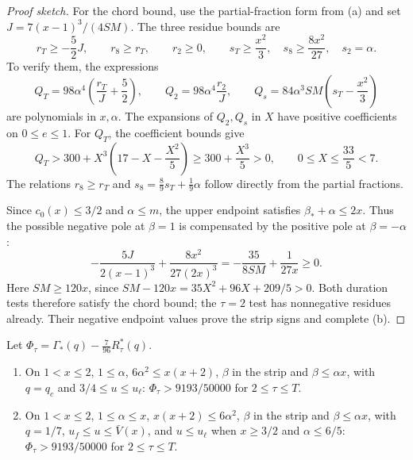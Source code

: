 \begin{proof}[Proof sketch]
For the chord bound, use the partial-fraction form from (a) and set
$J=7(x-1)^3/(4SM)$. The three residue bounds are
\[
 r_T\ge-\frac52J,\qquad r_8\ge r_T,\qquad r_2\ge0,
 \qquad s_T\ge\frac{x^2}3,\quad s_8\ge\frac{8x^2}{27},\quad s_2=\alpha.
\]
To verify them, the expressions
\[
 Q_T=98\alpha^4\left(\frac{r_T}{J}+\frac52\right),\qquad
 Q_2=98\alpha^4\frac{r_2}{J},\qquad
 Q_s=84\alpha^3SM\left(s_T-\frac{x^2}3\right)
\]
are polynomials in $x,\alpha$. The expansions of $Q_2,Q_s$ in $X$ have
positive coefficients on $0\le e\le1$. For $Q_T$, the coefficient bounds give
\[
 Q_T>300+X^3\left(17-X-\frac{X^2}5\right)
     \ge300+\frac{X^3}5>0,
 \qquad 0\le X\le\frac{33}5<7.
\]
The relations $r_8\ge r_T$ and $s_8=\frac89s_T+\frac19\alpha$
follow directly from the partial fractions.

Since $c_0(x)\le3/2$ and $\alpha\le m$, the upper endpoint satisfies
$\beta_*+\alpha\le2x$. Thus the possible negative pole at $\beta=1$
is compensated by the positive pole at $\beta=-\alpha$:
\[
 -\frac{5J}{2(x-1)^3}+\frac{8x^2}{27(2x)^3}
 =-\frac{35}{8SM}+\frac1{27x}\ge0.
\]
Here $SM\ge120x$, since
$SM-120x=35X^2+96X+209/5>0$. Both duration tests therefore satisfy the
chord bound; the $\tau=2$ test has nonnegative residues already.
Their negative endpoint values prove the strip signs and complete (b).
\end{proof}

\begin{proposition}\label{prop:ss-face-S1}
Let $\Phi_\tau=\Gamma_*(q)-\frac7{96}R^*_\tau(q)$.
\begin{enumerate}[label=(\alph*)]
\item On $1<x\le2$, $1\le\alpha$, $6\alpha^2\le x(x+2)$, $\beta$ in the strip and $\beta\le\alpha x$,
  with $q=q_c$ and $3/4\le u\le u_\ell$: $\Phi_\tau>9193/50000$ for $2\le\tau\le T$.
\item On $1<x\le2$, $1\le\alpha\le x$, $x(x+2)\le6\alpha^2$, $\beta$ in the strip and
  $\beta\le\alpha x$, with $q=1/7$, $u_f\le u\le\bar V(x)$, and $u\le u_\ell$ when $x\ge3/2$ and
  $\alpha\le6/5$: $\Phi_\tau>9193/50000$ for $2\le\tau\le T$.
\end{enumerate}
\end{proposition}

